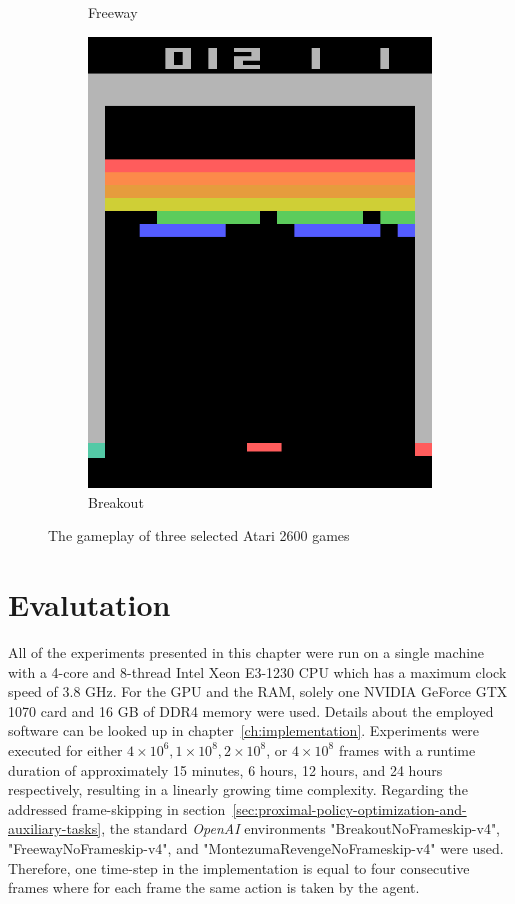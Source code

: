 \documentclass[draft,final]{vutinfth} %
\begin{document}
\begin{figure}[h]
\begin{subfigure}{.3\textwidth}
            \caption{Freeway}
            \label{fig:fway}
        \end{subfigure}
        \begin{subfigure}{.3\textwidth}
            \centering
            \includegraphics[width=.8\linewidth]{figures/breakout.png}
            \caption{Breakout}
            \label{fig:break}
        \end{subfigure} \caption{The gameplay of three selected Atari 2600 games}
        \label{fig:games}
    \end{figure}


    \section{Evalutation}
    All of the experiments presented in this chapter were run on a single machine with a 4-core and 8-thread Intel Xeon E3-1230 CPU which has a maximum clock speed of 3.8 GHz.
    For the GPU and the RAM, solely one NVIDIA GeForce GTX 1070 card and 16 GB of DDR4 memory were used.
    Details about the employed software can be looked up in chapter~\ref{ch:implementation}.
    Experiments were executed for either $4 \times 10^6, 1 \times 10^8, 2 \times 10^8$, or $4 \times 10^8$ frames with a runtime duration of approximately 15 minutes, 6 hours, 12 hours, and 24 hours respectively, resulting in a linearly growing time complexity.
    Regarding the addressed frame-skipping in section~\ref{sec:proximal-policy-optimization-and-auxiliary-tasks}, the standard \textit{OpenAI} environments "BreakoutNoFrameskip-v4", "FreewayNoFrameskip-v4", and "MontezumaRevengeNoFrameskip-v4" were used.
    Therefore, one time-step in the implementation is equal to four consecutive frames where for each frame the same action is taken by the agent.
\end{document}
